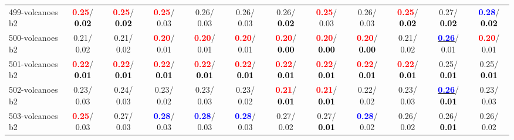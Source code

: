 \begin{table}[h]
\begin{center}
{\begin{tabular}{lc|c|c|c|c|c|c|c|c|c|c}
499-volcanoes b2 & \textcolor{red}{\textbf{  0.25}}/\textcolor{black}{\textbf{  0.02}} & \textcolor{red}{\textbf{  0.25}}/\textcolor{black}{\textbf{  0.02}} & \textcolor{red}{\textbf{  0.25}}/  0.03 &   0.26/  0.03 &   0.26/  0.03 &   0.26/\textcolor{black}{\textbf{  0.02}} & \textcolor{red}{\textbf{  0.25}}/  0.03 &   0.26/  0.03 & \textcolor{red}{\textbf{  0.25}}/\textcolor{black}{\textbf{  0.02}} &   0.27/\textcolor{black}{\textbf{  0.02}} & \textcolor{blue}{\textbf{  0.28}}/\textcolor{black}{\textbf{  0.02}} \\
500-volcanoes b2 &   0.21/  0.02 &   0.21/  0.02 & \textcolor{red}{\textbf{  0.20}}/  0.01 & \textcolor{red}{\textbf{  0.20}}/  0.01 & \textcolor{red}{\textbf{  0.20}}/  0.01 & \textcolor{red}{\textbf{  0.20}}/\textcolor{black}{\textbf{  0.00}} & \textcolor{red}{\textbf{  0.20}}/\textcolor{black}{\textbf{  0.00}} & \textcolor{red}{\textbf{  0.20}}/\textcolor{black}{\textbf{  0.00}} &   0.21/  0.02 & \underline{\textcolor{blue}{\textbf{  0.26}}}/  0.01 & \textcolor{red}{\textbf{  0.20}}/  0.01 \\
501-volcanoes b2 & \textcolor{red}{\textbf{  0.22}}/\textcolor{black}{\textbf{  0.01}} & \textcolor{red}{\textbf{  0.22}}/\textcolor{black}{\textbf{  0.01}} & \textcolor{red}{\textbf{  0.22}}/\textcolor{black}{\textbf{  0.01}} & \textcolor{red}{\textbf{  0.22}}/\textcolor{black}{\textbf{  0.01}} & \textcolor{red}{\textbf{  0.22}}/\textcolor{black}{\textbf{  0.01}} & \textcolor{red}{\textbf{  0.22}}/\textcolor{black}{\textbf{  0.01}} & \textcolor{red}{\textbf{  0.22}}/\textcolor{black}{\textbf{  0.01}} & \textcolor{red}{\textbf{  0.22}}/\textcolor{black}{\textbf{  0.01}} & \textcolor{red}{\textbf{  0.22}}/\textcolor{black}{\textbf{  0.01}} &   0.25/\textcolor{black}{\textbf{  0.01}} &   0.25/\textcolor{black}{\textbf{  0.01}} \\ \hline
502-volcanoes b2 &   0.23/  0.03 &   0.24/  0.03 &   0.23/  0.02 &   0.23/  0.03 &   0.23/  0.02 & \textcolor{red}{\textbf{  0.21}}/\textcolor{black}{\textbf{  0.01}} & \textcolor{red}{\textbf{  0.21}}/\textcolor{black}{\textbf{  0.01}} &   0.22/  0.02 &   0.23/  0.03 & \underline{\textcolor{blue}{\textbf{  0.26}}}/\textcolor{black}{\textbf{  0.01}} &   0.23/  0.03 \\
503-volcanoes b2 & \textcolor{red}{\textbf{  0.25}}/  0.03 &   0.27/  0.03 & \textcolor{blue}{\textbf{  0.28}}/  0.03 & \textcolor{blue}{\textbf{  0.28}}/  0.03 & \textcolor{blue}{\textbf{  0.28}}/  0.03 &   0.27/  0.02 &   0.27/\textcolor{black}{\textbf{  0.01}} & \textcolor{blue}{\textbf{  0.28}}/  0.02 &   0.26/  0.02 &   0.26/\textcolor{black}{\textbf{  0.01}} &   0.26/  0.02 \\

\end{tabular}}
\end{center}
\end{table}
